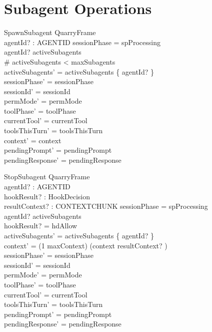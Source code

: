 \documentclass[a4paper,10pt,fleqn]{article}
\begin{document}
\section{Subagent Operations}

\begin{schema}{SpawnSubagent}
  QuarryFrame \\
  agentId? : AGENTID
  \where
  sessionPhase = spProcessing \\
  agentId? \notin activeSubagents \\
  \# activeSubagents < maxSubagents \\
  activeSubagents' = activeSubagents \cup \{ agentId? \} \\
  sessionPhase' = sessionPhase \\
  sessionId' = sessionId \\
  permMode' = permMode \\
  toolPhase' = toolPhase \\
  currentTool' = currentTool \\
  toolsThisTurn' = toolsThisTurn \\
  context' = context \\
  pendingPrompt' = pendingPrompt \\
  pendingResponse' = pendingResponse
\end{schema}

\begin{schema}{StopSubagent}
  QuarryFrame \\
  agentId? : AGENTID \\
  hookResult? : HookDecision \\
  resultContext? : CONTEXTCHUNK
  \where
  sessionPhase = spProcessing \\
  agentId? \in activeSubagents \\
  hookResult? = hdAllow \\
  activeSubagents' = activeSubagents \setminus \{ agentId? \} \\
  context' = (1 \upto maxContext) \dres (context \cat \langle resultContext? \rangle) \\
  sessionPhase' = sessionPhase \\
  sessionId' = sessionId \\
  permMode' = permMode \\
  toolPhase' = toolPhase \\
  currentTool' = currentTool \\
  toolsThisTurn' = toolsThisTurn \\
  pendingPrompt' = pendingPrompt \\
  pendingResponse' = pendingResponse
\end{schema}
\end{document}
